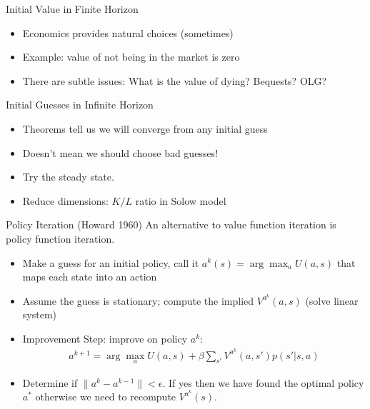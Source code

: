 \documentclass[aspectratio=169,11pt]{beamer}
\begin{document}
\begin{frame}{Initial Value in Finite Horizon}
\begin{itemize}
\item Economics provides natural choices (sometimes)
\item Example: value of not being in the market is zero
\item There are subtle issues: What is the value of dying? Bequests? OLG?
\end{itemize}
\end{frame}

\begin{frame}{Initial Guesses in Infinite Horizon}
\begin{itemize}
\item Theorems tell us we will converge from any initial guess
\item Doesn't mean we should choose bad guesses!
\item Try the steady state.
\item Reduce dimensions:  $K/L$ ratio in Solow model
\end{itemize}
\end{frame}



\begin{frame}{Policy Iteration (Howard 1960)}
An alternative to value function iteration is policy function iteration. 
\begin{itemize}
\item Make a guess for an initial policy, call it $a^k(s) = \arg \max_a U(a,s)$ that maps each state into an action
\item Assume the guess is stationary;  compute the implied $V^{a^k}(a,s)$ (solve linear system)
\item Improvement Step: improve on policy $a^k$:
\begin{eqnarray*}
a^{k+1} = \arg \max_a U(a,s) + \beta \sum_{s'} V^{a^k}(a,s') p(s' | s,a)
\end{eqnarray*}
\item Determine if $\| a^k -a^{k-1}\| < \epsilon$. If yes then we have found the optimal policy $a^* $ otherwise we need to recompute $V^{a^k}(s)$.
\end{itemize}
\end{frame}
\end{document}
